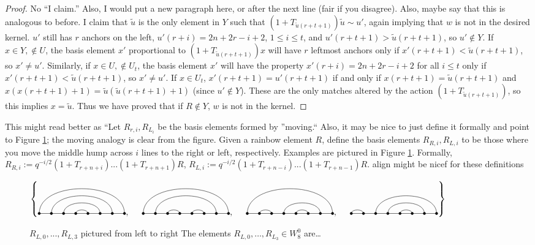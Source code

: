 \documentclass{amsart}
\begin{document}
\begin{proof}
  {\color{magenta} No ``I claim.'' Also, I would put a new paragraph here, or after the next line (fair if you disagree). Also, maybe say that this is analogous to before.}
  I claim that $\tilde{u}$ is the only element in $Y$ such that $(1+T_{\tilde{u}(r+t+1)})\tilde{u}\sim u'$, again implying that $w$ is not in the desired kernel. $u'$ still has $r$ anchors on the left, $u'(r+i)=2n+2r-i+2$, $1\leq i\leq t$, and $u'(r+t+1)>\tilde{u}(r+t+1)$, so $u'\not\in Y$. If $x\in Y,\not\in U$,  the basis element $x'$ proportional to $(1+T_{\tilde{u}(r+t+1)})x$ will have $r$ leftmost anchors only if $x'(r+t+1)<\tilde{u}(r+t+1)$, so $x'\not=u'$. Similarly, if $x\in U,\not\in U_t$, the basis element $x'$ will have the property $x'(r+i)=2n+2r-i+2$ for all $i\leq t$ only if $x'(r+t+1)<\tilde{u}(r+t+1)$, so $x'\not=u'$. If $x\in U_t$, $x'(r+t+1)=u'(r+t+1)$ if and only if $x(r+t+1)=\tilde{u}(r+t+1)$ and $x(x(r+t+1)+1)=\tilde{u}(\tilde{u}(r+t+1)+1)$ (since $u'\not \in Y$). These are the only matches altered by the action $(1+T_{\tilde{u}(r+t+1)})$, so this implies $x=\tilde{u}$. Thus we have proved that if $R\not\in Y$, $w$ is not in the kernel.
	
\end{proof}

{\color{magenta} This might read better as ``Let $R_{r,i},R_{L_i}$ be the basis elements formed by ''moving.``
Also, it may be nice to just define it formally and point to Figure \ref{shifted rainbow};
the moving analogy is clear from the figure.
}
Given a rainbow element $R$, define the basis elements $R_{R,i},R_{L,i}$ to be those where you move the middle hump across $i$ lines to the right or left, respectively. Examples are pictured in {\color{magenta} Figure \ref{shifted rainbow}}. Formally, $R_{R,i}:=q^{-i/2}(1+T_{r+n+i})...(1+T_{r+n+1})R$, $R_{L,i}:=q^{-i/2}(1+T_{r+n-i})...(1+T_{r+n-1})R$.{\color{magenta} align might be nicef for these definitions}

\begin{figure}
	\def\cbasisspacing{5mm}
	$\cbr{
		\begin{gathered}
		\Matching{8}{1/8, 2/7, 3/6, 4/5}, \hspace{\cbasisspacing}
		\Matching{8}{1/8, 2/7, 3/4, 5/6}, \hspace{\cbasisspacing}
		\Matching{8}{1/8, 2/3, 4/7, 5/6}, \hspace{\cbasisspacing}
		\Matching{8}{1/2,3/8,4/7,5/6}
		\end{gathered}}$
	\caption{$R_{L,0},...,R_{L,3}$ pictured from left to right
  {\color{magenta} The elements $R_{L,0},\dots,R_{L_3} \in W_8^0$ are\ldots}
}
	\label{shifted rainbow}
\end{figure}
\end{document}
